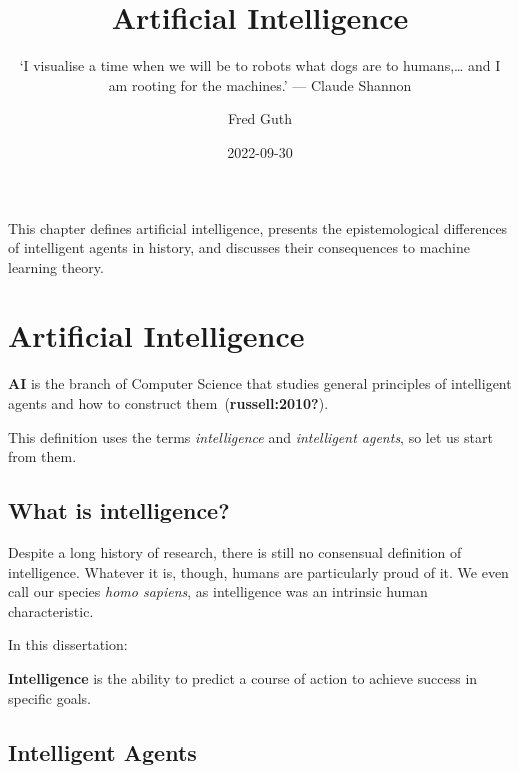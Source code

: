 \documentclass[
  letterpaper,
  DIV=11,
  numbers=noendperiod,
  oneside]{scrreprt}
\title{Artificial Intelligence}
\subtitle{`I visualise a time when we will be to robots what dogs are to
humans,\ldots{} and I am rooting for the machines.' --- Claude Shannon}
\author{Fred Guth}
\date{2022-09-30}
\renewcommand*\contentsname{Table of contents}
\newcommand\contentsname{Table of contents}
\begin{document}
\maketitle
\ifdefined\Shaded\renewenvironment{Shaded}{\begin{tcolorbox}[frame hidden, boxrule=0pt, breakable, enhanced, interior hidden, borderline west={3pt}{0pt}{shadecolor}, sharp corners]}{\end{tcolorbox}}\fi

\renewcommand*\contentsname{Table of contents}
{
\hypersetup{linkcolor=}
\setcounter{tocdepth}{2}
\tableofcontents
}
This chapter defines artificial intelligence, presents the
epistemological differences of intelligent agents in history, and
discusses their consequences to machine learning theory.

\hypertarget{artificial-intelligence}{%
\section{Artificial Intelligence}\label{artificial-intelligence}}

\protect\hypertarget{def-ai}{}{} \textbf{AI} is the branch of Computer
Science that studies general principles of intelligent agents and how to
construct them~(\textbf{russell:2010?}).

This definition uses the terms \emph{intelligence} and \emph{intelligent
agents}, so let us start from them.

\hypertarget{what-is-intelligence}{%
\subsection{What is intelligence?}\label{what-is-intelligence}}

Despite a long history of research, there is still no consensual
definition of intelligence. Whatever it is, though, humans are particularly
proud of it. We even call our species \emph{homo sapiens}, as
intelligence was an intrinsic human characteristic.

In this dissertation:

\protect\hypertarget{def-intelligence}{}{\textbf{Intelligence}} is the
ability to predict a course of action to achieve success in specific
goals.

\hypertarget{intelligent-agents}{%
\subsection{Intelligent Agents}\label{intelligent-agents}}
\end{document}
